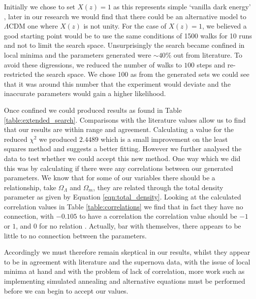 \documentclass[twocolumn]{revtex4}
\begin{document}
{{Initially we chose to set $X(z)=1$ as this represents simple `vanilla dark energy' \cite{cosmo_constraints}, later in our research we would find that there could be an alternative model to $\Lambda$CDM one where $X(z)$ is not unity. For the case of $X(z)=1$, we believed a good starting point would be to use the same conditions of 1500 walks for 10 runs and not to limit the search space. Unsurprisingly the search became confined in local minima and the parameters generated were $\sim40\%$ out from literature. To avoid these digressions, we reduced the number of walks to $100$ steps and re-restricted the search space. We chose 100 as from the generated sets we could see that it was around this number that the experiment would deviate and the inaccurate parameters would gain a higher likelihood.

Once confined we could produced results as found in Table \ref{table:extended_search}. Comparisons with the literature values allow us to find that our results are within range and agreement. Calculating a value for the reduced $\chi^2$ we produced $2.4489$ which is a small improvement on the least squares method and suggests a better fitting. However we further analysed the data to test whether we could accept this new method. One way which we did this was by calculating if there were any correlations between our generated parameters. We know that for some of our variables there should be a relationship, take $\Omega_\Lambda$ and $\Omega_m$, they are related through the total density parameter as given by Equation \ref{eqn:total_density}. Looking at the calculated correlation values in Table \ref{table:correlations} we find that in fact they have no connection, with $-0.105$ to have a correlation the correlation value should be $-1$ or $1$, and $0$ for no relation \cite{hugheshase}. Actually, bar with themselves, there appears to be little to no connection between the parameters.

Accordingly we must therefore remain skeptical in our results, whilst they appear to be in agreement with literature and the supernova data, with the issue of local minima at hand and with the problem of lack of correlation, more work such as implementing simulated annealing and alternative equations must be performed before we can begin to accept our values. 

}}
\end{document}
